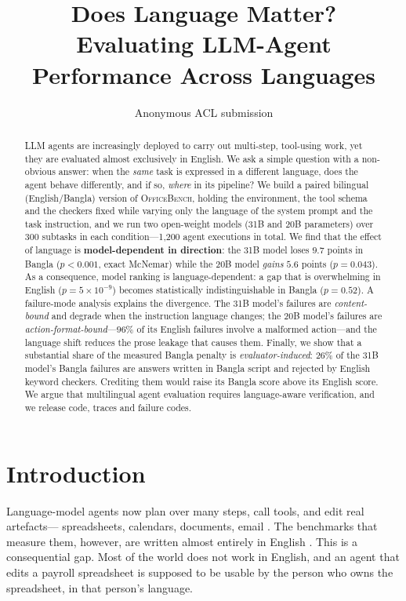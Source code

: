 \documentclass[11pt]{article}
\title{Does Language Matter? \\ Evaluating LLM-Agent Performance Across Languages}
\author{Anonymous ACL submission}
\begin{document}
\maketitle

\begin{abstract}
LLM agents are increasingly deployed to carry out multi-step, tool-using work, yet they are
evaluated almost exclusively in English. We ask a simple question with a non-obvious answer:
when the \emph{same} task is expressed in a different language, does the agent behave
differently, and if so, \emph{where} in its pipeline?
We build a paired bilingual (English/Bangla) version of \textsc{OfficeBench}, holding the
environment, the tool schema and the checkers fixed while varying only the language of the
system prompt and the task instruction, and we run two open-weight models (31B and 20B
parameters) over 300 subtasks in each condition---1{,}200 agent executions in total.
We find that the effect of language is \textbf{model-dependent in direction}: the 31B model
loses $9.7$ points in Bangla ($p{<}0.001$, exact McNemar) while the 20B model \emph{gains}
$5.6$ points ($p{=}0.043$). As a consequence, model ranking is language-dependent: a gap that
is overwhelming in English ($p{=}5{\times}10^{-9}$) becomes statistically indistinguishable in
Bangla ($p{=}0.52$).
A failure-mode analysis explains the divergence. The 31B model's failures are
\emph{content-bound} and degrade when the instruction language changes; the 20B model's
failures are \emph{action-format-bound}---$96\%$ of its English failures involve a malformed
action---and the language shift reduces the prose leakage that causes them.
Finally, we show that a substantial share of the measured Bangla penalty is
\emph{evaluator-induced}: $26\%$ of the 31B model's Bangla failures are answers written in
Bangla script and rejected by English keyword checkers. Crediting them would raise its Bangla
score above its English score. We argue that multilingual agent evaluation requires
language-aware verification, and we release code, traces and failure codes.
\end{abstract}

\section{Introduction}

Language-model agents now plan over many steps, call tools, and edit real artefacts---
spreadsheets, calendars, documents, email \citep{yao2023react,liu2023agentbench,zhou2024webarena}.
The benchmarks that measure them, however, are written almost entirely in English
\citep{jimenez2024swebench,xie2024osworld,mialon2024gaia}. This is a consequential gap. Most
of the world does not work in English, and an agent that edits a payroll spreadsheet is
supposed to be usable by the person who owns the spreadsheet, in that person's language.
\end{document}
